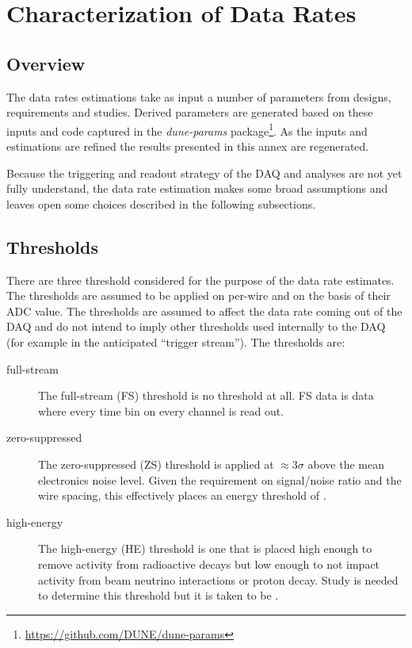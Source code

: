 \chapter{Characterization of Data Rates}
\label{ch:annex-rate}

\section{Overview}

The data rates estimations take as input a number of parameters from
designs, requirements and studies.
Derived parameters are generated based on these inputs and code
captured in the \textit{dune-params} package\footnote{\url{https://github.com/DUNE/dune-params}}.
As the inputs and estimations are refined the results presented in
this annex are regenerated.

Because the triggering and readout strategy of the DAQ and analyses
are not yet fully understand, the data rate estimation makes some
broad assumptions and leaves open some choices described in the
following subsections.



\section{Thresholds}

There are three threshold considered for the purpose of the data rate estimates.
The thresholds are assumed to be applied on per-wire and on the basis
of their ADC value.
The thresholds are assumed to affect the data rate coming out of the
DAQ and do not intend to imply other thresholds used internally to the
DAQ (for example in the anticipated ``trigger stream'').
The thresholds are:

\begin{description}
\item[full-stream] The full-stream (FS) threshold is no threshold at all.
FS data is data where every time bin on every channel is read out.
\item[zero-suppressed] The zero-suppressed (ZS) threshold is applied
  at $\approx 3\sigma$ above the mean electronics noise level.
  Given the requirement on signal/noise ratio and the wire spacing,
  this effectively places an energy threshold of
  \chargezsthreshold.
\item[high-energy] The high-energy (HE) threshold is one that is
  placed high enough to remove activity from radioactive decays but
  low enough to not impact activity from beam neutrino interactions or
  proton decay.
  Study is needed to determine this threshold but it is taken to be
  \chargehethreshold.
\end{description}


